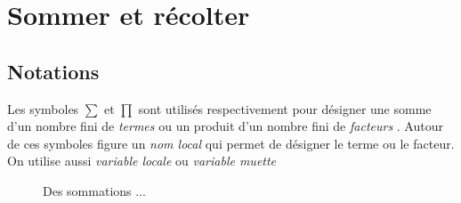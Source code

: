 

\section{Sommer et récolter}
\subsection{Notations}
Les symboles $\sum$ et $\prod$ sont utilisés respectivement pour désigner une somme d'un nombre fini de \emph{termes}  ou un produit d'un nombre fini de \emph{facteurs} . Autour de ces symboles figure un \emph{nom local} qui permet de désigner le terme ou le facteur. On utilise aussi \emph{variable locale} ou \emph{variable muette} 
\begin{figure}[h]
  \centering
  \hspace{1cm}
  \hspace{1cm}
  \caption{Des sommations ...}
\end{figure}
